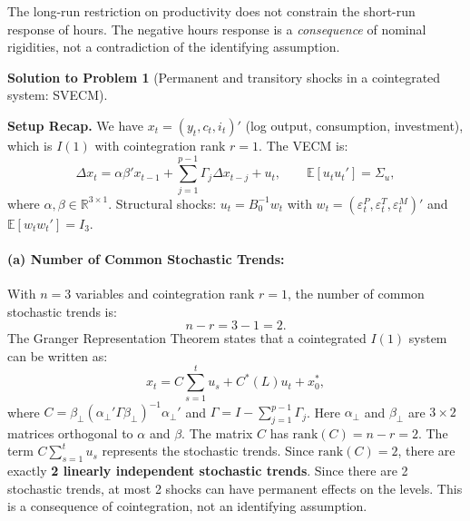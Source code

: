\documentclass[12pt]{article}
\newcommand{\R}{\mathbb R}
\newcommand{\E}{\mathbb E}
\newcommand{\rank}{\mathrm{rank}}
\theoremstyle{definition}
\newtheorem{solution}{Solution to Problem}
\begin{document}
\noindent The long-run restriction on productivity does not constrain the short-run response of hours. The negative hours response is a \emph{consequence} of nominal rigidities, not a contradiction of the identifying assumption.

\newpage
\begin{solution}[Permanent and transitory shocks in a cointegrated system: SVECM]
\end{solution}

\noindent\textbf{Setup Recap.} We have $x_t = (y_t, c_t, i_t)'$ (log output, consumption, investment), which is $I(1)$ with cointegration rank $r = 1$. The VECM is:
\[
\Delta x_t = \alpha \beta' x_{t-1} + \sum_{j=1}^{p-1} \Gamma_j \Delta x_{t-j} + u_t, \qquad \E[u_t u_t'] = \Sigma_u,
\]
where $\alpha, \beta \in \R^{3 \times 1}$. Structural shocks: $u_t = B_0^{-1} w_t$ with $w_t = (\varepsilon_t^P, \varepsilon_t^T, \varepsilon_t^M)'$ and $\E[w_t w_t'] = I_3$.

\bigskip
\paragraph{(a) Number of Common Stochastic Trends:} With $n = 3$ variables and cointegration rank $r = 1$, the number of common stochastic trends is:
\[
\boxed{n - r = 3 - 1 = 2.}
\]
The Granger Representation Theorem states that a cointegrated $I(1)$ system can be written as:
\[
x_t = C \sum_{s=1}^{t} u_s + C^*(L) u_t + x_0^*,
\]
where $C = \beta_\perp (\alpha_\perp' \Gamma \beta_\perp)^{-1} \alpha_\perp'$ and $\Gamma = I - \sum_{j=1}^{p-1} \Gamma_j$. Here $\alpha_\perp$ and $\beta_\perp$ are $3 \times 2$ matrices orthogonal to $\alpha$ and $\beta$. The matrix $C$ has $\rank(C) = n - r = 2$. The term $C \sum_{s=1}^{t} u_s$ represents the stochastic trends. Since $\rank(C) = 2$, there are exactly \textbf{2 linearly independent stochastic trends}.
Since there are 2 stochastic trends, at most 2 shocks can have permanent effects on the levels. This is a consequence of cointegration, not an identifying assumption.

\bigskip
\end{document}
